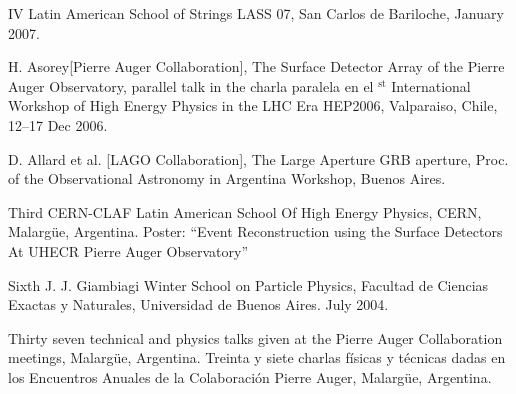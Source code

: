 \begin{etaremune}
\item {}IV Latin American School of Strings LASS 07, San Carlos de Bariloche, January 2007.

\item {}H. Asorey[Pierre Auger Collaboration], {{The Surface Detector Array of the Pierre Auger Observatory}}, 
\ifeng
parallel talk in the 
\else
charla paralela en el 
$^{\mathrm{st}}$ International Workshop of High Energy Physics in the LHC Era HEP2006, Valparaiso, Chile, 12--17 Dec 2006.

\item {}D. Allard { et al.} [LAGO Collaboration], {{The Large Aperture GRB aperture}}, \en Proc.
of the Observational Astronomy in Argentina Workshop, Buenos Aires.

\item {}Third CERN-CLAF Latin American School Of High Energy Physics, CERN, Malargüe, Argentina.
Poster: ``Event Reconstruction using the Surface Detectors At UHECR Pierre Auger Observatory''

\item {}Sixth J. J. Giambiagi Winter School on Particle Physics, Facultad de Ciencias Exactas y Naturales, Universidad de Buenos Aires.
July 2004.

\item {} 
\ifeng
Thirty seven technical and physics talks given at the Pierre Auger Collaboration meetings, Malargüe, Argentina.
\else
Treinta y siete charlas físicas y técnicas dadas en los Encuentros Anuales de la Colaboración Pierre Auger, Malargüe, Argentina.
\fi
\end{etaremune}
